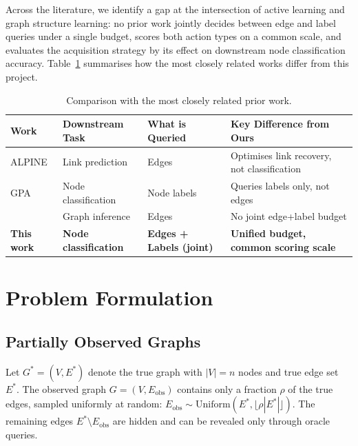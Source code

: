 \documentclass[12pt,a4paper,oneside]{report}
\begin{document}
Across the literature, we identify a gap at the intersection of active learning and graph structure learning: no prior work jointly decides between edge and label queries under a single budget, scores both action types on a common scale, and evaluates the acquisition strategy by its effect on downstream node classification accuracy. Table~\ref{tab:related} summarises how the most closely related works differ from this project.

\begin{table}[htbp]
\centering
\caption{Comparison with the most closely related prior work.}
\label{tab:related}
\small
\begin{tabularx}{\textwidth}{>{\raggedright\arraybackslash}p{2.8cm}>{\raggedright\arraybackslash}X>{\raggedright\arraybackslash}X>{\raggedright\arraybackslash}X}
\toprule
Work & Downstream Task & What is Queried & Key Difference from Ours \\
\midrule
ALPINE \citep{alpine} & Link prediction & Edges & Optimises link recovery, not classification \\
GPA \citep{gpa} & Node classification & Node labels & Queries labels only, not edges \\
\citet{scout} & Graph inference & Edges & No joint edge+label budget \\
\textbf{This work} & \textbf{Node classification} & \textbf{Edges + Labels (joint)} & \textbf{Unified budget, common scoring scale} \\
\bottomrule
\end{tabularx}
\end{table}


\chapter{Problem Formulation}
\label{ch:formulation}

\section{Partially Observed Graphs}

Let $G^* = (V, E^*)$ denote the true graph with $|V| = n$ nodes and true edge set $E^*$. The observed graph $G = (V, E_{\text{obs}})$ contains only a fraction $\rho$ of the true edges, sampled uniformly at random: $E_{\text{obs}} \sim \text{Uniform}(E^*, \lfloor \rho |E^*| \rfloor)$. The remaining edges $E^* \setminus E_{\text{obs}}$ are hidden and can be revealed only through oracle queries.
\end{document}
